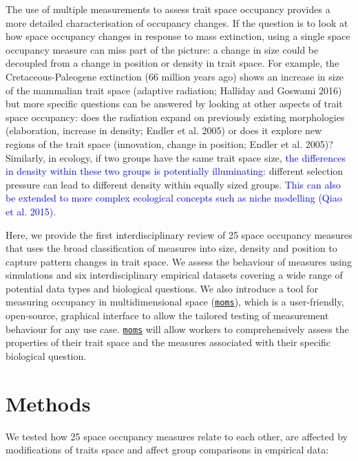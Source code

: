 \documentclass[]{article}
\begin{document}
The use of multiple measurements to assess trait space occupancy
provides a more detailed characterisation of occupancy changes. If the
question is to look at how space occupancy changes in response to mass
extinction, using a single space occupancy measure can miss part of the
picture: a change in size could be decoupled from a change in position
or density in trait space. For example, the Cretaceous-Paleogene
extinction (66 million years ago) shows an increase in size of the
mammalian trait space (adaptive radiation; Halliday and Goswami 2016)
but more specific questions can be answered by looking at other aspects
of trait space occupancy: does the radiation expand on previously
existing morphologies (elaboration, increase in density; Endler et al.
2005) or does it explore new regions of the trait space (innovation,
change in position; Endler et al. 2005)? Similarly, in ecology, if two
groups have the same trait space size,
\textcolor{blue}{the differences in density within
these two groups is potentially illuminating:} different selection
pressure can lead to different density within equally sized groups.
\textcolor{blue}{This can also be extended to more
complex ecological concepts such as niche modelling (Qiao et al.
2015).}

Here, we provide the first interdisciplinary review of 25 space
occupancy measures that uses the broad classification of measures into
size, density and position to capture pattern changes in trait space. We
assess the behaviour of measures using simulations and six
interdisciplinary empirical datasets covering a wide range of potential
data types and biological questions. We also introduce a tool for
measuring occupancy in multidimensional space
(\href{https://tguillerme.shinyapps.io/moms/}{\texttt{moms}}), which is
a user-friendly, open-source, graphical interface to allow the tailored
testing of measurement behaviour for any use case.
\href{https://tguillerme.shinyapps.io/moms/}{\texttt{moms}} will allow
workers to comprehensively assess the properties of their trait space
and the measures associated with their specific biological question.

\section{Methods}\label{methods}

We tested how 25 space occupancy measures relate to each other, are
affected by modifications of traits space and affect group comparisons
in empirical data:
\end{document}
